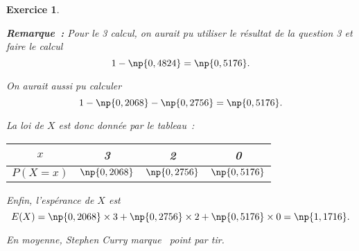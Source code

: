 \documentclass[10pt]{article}
\newtheorem{exo}{Exercice}
\begin{document}
\begin{exo}
\begin{enumerate}
\textbf{Remarque~:} Pour le 3 calcul, on aurait pu utiliser le résultat de la question 3 et faire le calcul \[1-\np{0,4824}=\np{0,5176}.\]

On aurait aussi pu calculer \[1-\np{0,2068}-\np{0,2756}=\np{0,5176}.\]


\medskip

La loi de $X$ est donc donnée par le tableau~:

\begin{center}
\renewcommand{\arraystretch}{1.5}
\begin{tabular}{|c|c|c|c|}
\hline
   $x$     & 3      & 2       & 0   \\
\hline
$P(X=x)$ & $\np{0,2068}$ &$\np{0,2756}$ &$\np{0,5176}$      \\
\hline
\end{tabular}
\end{center}

\medskip

Enfin, l'espérance de $X$ est \[E(X)=\np{0,2068}\times 3+\np{0,2756}\times 2+\np{0,5176}\times 0= \np{1,1716}.\]

En moyenne, Stephen Curry marque ~point par tir.

\end{enumerate}


\end{exo}
\end{document}
